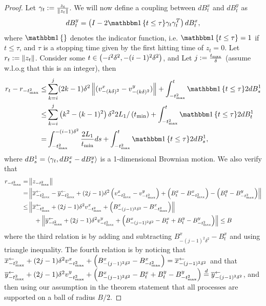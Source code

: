\begin{proof}
    Let $\gamma_t := \frac{z_t}{\left\| z_t \right\|}$. We will now define a coupling between $dB^x_t$ and $dB^y_t$ as 
    \begin{align*}
        dB^y_t = \lrp{I - 2 \ind{t\leq \tau} \gamma_t \gamma_t^T} dB^x_t,
    \end{align*}
    where $\ind{}$ denotes the indicator function, i.e. $\ind{t\leq \tau} = 1$ if $t\leq \tau$, and $\tau$ is a stopping time given by the first hitting time of $z_t = 0$. Let $r_t := \left\| z_t \right\|$. Consider some $t\in \left( -i^2\delta^2, -(i-1)^2\delta^2 \right)$, and Let $j := \frac{t_{\textrm{max}}}{\delta}$ (assume w.l.o.g that this is an integer), then
    \begin{align*}
        r_t - r_{-\tmax^2}
        \leq& \sum_{k=i}^j (2k-1)\delta^2 \lrn{(v^x_{-(k\delta)^2}-v^y_{-(k\delta)^2})} + \int_{-\tmax^2}^{t} \ind{t\leq \tau} 2 dB^1_s\\
        \leq& \sum_{k=i}^j  \lrp{k^2 - (k-1)^2} \delta^2 2L_1/\lrp{\tmin} + \int_{-\tmax^2}^{t} \ind{t\leq \tau} 2 dB^1_t\\
        =& \int_{-\tmax^2}^{-(i-1)\delta^2}  \frac{2L_1}{\tmin} ds + \int_{-\tmax^2}^{t}  \ind{t\leq \tau} 2dB^1_s,
    \end{align*}
    where $dB^1_s = \left\langle \gamma_t, dB^x_s - dB^y_s \right\rangle$ is a 1-dimensional Brownian motion. We also verify that
    \begin{align*}
        r_{-t_{\textrm{max}}^2} 
        =& \left\| z_{-t_{\textrm{max}}^2} \right\|\\
        =& \left\| \overline{x}^{\leftarrow}_{-t_{\textrm{max}}^2} - \overline{y}^{\leftarrow}_{-t_{\textrm{max}}^2} + (2j-1)\delta^2 \left( v^x_{-t_{\textrm{max}}^2}-v^y_{-t_{\textrm{max}}^2} \right) + \left( B^x_t - B^x_{-t_{\textrm{max}}^2} \right) - \left( B^y_t - B^y_{-t_{\textrm{max}}^2} \right) \right\|\\
        \leq& \left\| \overline{x}^{\leftarrow}_{-t_{\textrm{max}}^2} + (2j-1)\delta^2 v^x_{-t_{\textrm{max}}^2}+ \left( B^x_{-(j-1)^2 \delta^2} - B^x_{-t_{\textrm{max}}^2} \right) \right\| \\
        &\quad + \left\| \overline{y}^{\leftarrow}_{-t_{\textrm{max}}^2} + (2j-1)\delta^2 v^y_{-t_{\textrm{max}}^2}+ \left( B^x_{-(j-1)^2 \delta^2} - B^x_{t} + B^y_{t} - B^y_{-t_{\textrm{max}}^2} \right) \right\|
        \leq B
    \end{align*}
    where the third relation is by adding and subtracting $B^x_{-(j-1)^2 \delta^2} - B^x_{t}$ and using triangle inequality. The fourth relation is by noticing that $\overline{x}^{\leftarrow}_{-t_{\textrm{max}}^2} + (2j-1)\delta^2 v^x_{-t_{\textrm{max}}^2}+ \left( B^x_{-(j-1)^2 \delta^2} - B^x_{-t_{\textrm{max}}^2} \right) = \overline{x}^{\leftarrow}_{-(j-1)^2\delta^2}$ and that $\overline{y}^{\leftarrow}_{-t_{\textrm{max}}^2} + (2j-1)\delta^2 v^y_{-t_{\textrm{max}}^2}+ \left( B^x_{-(j-1)^2 \delta^2} - B^x_{t} + B^y_{t} - B^y_{-t_{\textrm{max}}^2} \right) \overset{d}{=} \overline{y}^{\leftarrow}_{-(j-1)^2\delta^2}$, and then using our assumption in the theorem statement that all processes are supported on a ball of radius $B/2$.


\end{proof}
